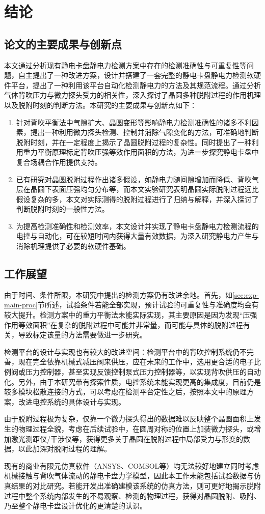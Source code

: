 \cleardoublepage
\chapter{结论}\label{ch:conclusion}


\section{论文的主要成果与创新点 }\label{sec:conclusion-review}

本文通过分析现有静电卡盘静电力检测方案中存在的检测准确性与可重复性等问题，自主提出了一种改进方案，设计并搭建了一套完整的静电卡盘静电力检测软硬件平台，提出了一种利用该平台自动化检测静电力的方法及其规范流程。通过分析气体背吹压力与微力探头受力的相关性，深入探讨了晶圆多种脱附过程的作用机理以及脱附时刻的判断方法。本研究的主要成果与创新点如下：

\begin{enumerate}
  \item 针对背吹平衡法中气隙扩大、晶圆变形等影响静电力检测准确性的诸多不利因素，提出一种利用微力探头检测、控制并消除气隙变化的方法，可准确地判断脱附时刻，并在一定程度上揭示了晶圆脱附过程的复杂性。同时提出了一种利用重力平衡原理标定背吹压强等效作用面积的方法，为进一步探究静电卡盘中复合场耦合作用提供支持。
  \item
  已有研究对晶圆脱附过程作出诸多假设，如静电力随间隙增加而降低、背吹气层在晶圆下表面压强均匀分布等，而本文实验研究表明晶圆实际脱附过程远比假设复杂的多，本文对实际测得的脱附过程进行了归纳与解释，并深入探讨了判断脱附时刻的一般性方法。
  \item 为提高检测准确性和检测效率，本文设计并实现了静电卡盘静电力检测流程的电控与自动化，可在较短时间内获得大量有效数据，为深入研究静电力产生与消除机理提供了必要的软硬件基础。
\end{enumerate}



\section{工作展望}\label{sec:conclusion-future}

由于时间、条件所限，本研究中提出的检测方案仍有改进余地。首先，如\ref{sec:exp-main-proc}节所述，试验条件若能全部实现，预计试验的可重复性与准确度均会有较大提升。检测方案中的重力平衡法未能实际实现，其主要原因是因为发现“压强作用等效面积”在复杂的脱附过程中可能并非常量，而可能与具体的脱附过程有关，导致标定该量的方法需要做进一步研究。

检测平台的设计与实现也有较大的改进空间：检测平台中的背吹控制系统仍不完善，现在完全依靠机械式减压阀来供压，应在未来的工作中，选用更合适的电子比例阀或压力控制器，甚至实现反馈控制泵式压力控制器等，以实现背吹供压的自动化。另外，由于本研究带有探索性质，电控系统未能实现更高的集成度，目前仍是较多模块松散连接的方式，可以考虑在检测平台定性之后，按照本文中的原理方案，改进电控系统的具体设计与实现。

由于脱附过程极为复杂，仅靠一个微力探头得出的数据难以反映整个晶圆面积上发生的物理过程全貌，考虑在后续试验中，在圆周对称的位置上加装微力探头，或增加激光测距仪/干涉仪等，获得更多关于晶圆在脱附过程中局部受力与形变的数据，以此加深对脱附过程的理解。

现有的商业有限元仿真软件（ANSYS、COMSOL等）均无法较好地建立同时考虑机械接触与背吹气体流动的静电卡盘力学模型，因此本工作未能包括试验数据与仿真结果的对比研究。若能开发出准确建模该系统的仿真方法，则可更好地揭示脱附过程中整个系统内部发生的不易观察、检测的物理过程，获得对晶圆脱附、吸附、乃至整个静电卡盘设计优化的更清楚的认识。
